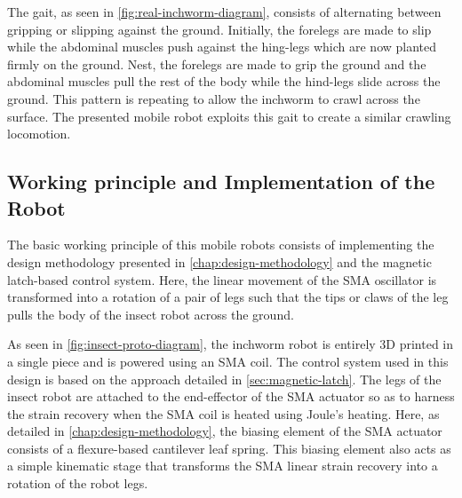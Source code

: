 The gait, as seen in \cref{fig:real-inchworm-diagram}, consists of alternating between gripping or slipping against the ground. Initially, the forelegs are made to slip while the abdominal muscles push against the hing-legs which are now planted firmly on the ground. Nest, the forelegs are made to grip the ground and the abdominal muscles pull the rest of the body while the hind-legs slide across the ground. This pattern is repeating to allow the inchworm to crawl across the surface. The presented mobile robot exploits this gait to create a similar crawling locomotion.

\subsection{Working principle and Implementation of the Robot}

The basic working principle of this mobile robots consists of implementing the design methodology presented in \cref{chap:design-methodology} and the magnetic latch-based control system. Here, the linear movement of the SMA oscillator is transformed into a rotation of a pair of legs such that the tips or claws of the leg pulls the body of the insect robot across the ground.

As seen in \cref{fig:insect-proto-diagram}, the inchworm robot is entirely 3D printed in a single piece and is powered using an SMA coil. The control system used in this design is based on the approach detailed in \cref{sec:magnetic-latch}. The legs of the insect robot are attached to the end-effector of the SMA actuator so as to harness the strain recovery when the SMA coil is heated using Joule's heating. Here, as detailed in \cref{chap:design-methodology}, the biasing element of the SMA actuator consists of a flexure-based cantilever leaf spring. This biasing element also acts as a simple kinematic stage that transforms the SMA linear strain recovery into a rotation of the robot legs.

